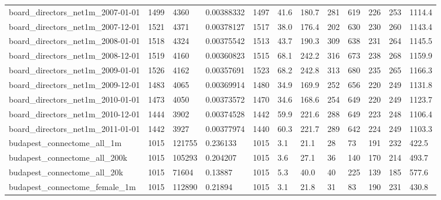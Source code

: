\begin{longtable}{llllllllllll}
 board\_directors\_net1m\_2007-01-01                   & 1499       & 4360      & 0.00388332  & 1497  & 41.6   & 180.7  & 281   & 619    & 226    & 253    & 1114.4  \\
 board\_directors\_net1m\_2007-12-01                   & 1521       & 4371      & 0.00378127  & 1517  & 38.0   & 176.4  & 202   & 630    & 230    & 260    & 1143.4  \\
 board\_directors\_net1m\_2008-01-01                   & 1518       & 4324      & 0.00375542  & 1513  & 43.7   & 190.3  & 309   & 638    & 231    & 264    & 1145.5  \\
 board\_directors\_net1m\_2008-12-01                   & 1519       & 4160      & 0.00360823  & 1515  & 68.1   & 242.2  & 316   & 673    & 238    & 268    & 1159.9  \\
 board\_directors\_net1m\_2009-01-01                   & 1526       & 4162      & 0.00357691  & 1523  & 68.2   & 242.8  & 313   & 680    & 235    & 265    & 1166.3  \\
 board\_directors\_net1m\_2009-12-01                   & 1483       & 4065      & 0.00369914  & 1480  & 34.9   & 169.9  & 252   & 656    & 220    & 249    & 1131.8  \\
 board\_directors\_net1m\_2010-01-01                   & 1473       & 4050      & 0.00373572  & 1470  & 34.6   & 168.6  & 254   & 649    & 220    & 249    & 1123.7  \\
 board\_directors\_net1m\_2010-12-01                   & 1444       & 3902      & 0.00374528  & 1442  & 59.9   & 221.6  & 288   & 649    & 223    & 248    & 1106.4  \\
 board\_directors\_net1m\_2011-01-01                   & 1442       & 3927      & 0.00377974  & 1440  & 60.3   & 221.7  & 289   & 642    & 224    & 249    & 1103.3  \\
 budapest\_connectome\_all\_1m                         & 1015       & 121755    & 0.236133    & 1015  & 3.1    & 21.1   & 28    & 73     & 191    & 232    & 422.5   \\
 budapest\_connectome\_all\_200k                       & 1015       & 105293    & 0.204207    & 1015  & 3.6    & 27.1   & 36    & 140    & 170    & 214    & 493.7   \\
 budapest\_connectome\_all\_20k                        & 1015       & 71604     & 0.13887     & 1015  & 5.3    & 40.0   & 40    & 225    & 139    & 185    & 577.6   \\
 budapest\_connectome\_female\_1m                      & 1015       & 112890    & 0.21894     & 1015  & 3.1    & 21.8   & 31    & 83     & 190    & 231    & 430.8   \\

\end{longtable}
